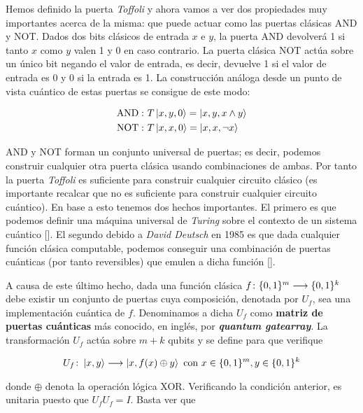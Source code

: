 Hemos definido la puerta \textit{Toffoli} y ahora vamos a ver dos propiedades muy importantes acerca de la misma: que puede actuar como las puertas clásicas AND y NOT. Dados dos bits clásicos de entrada $x$ e $y$, la puerta AND devolverá 1 si tanto $x$ como $y$ valen 1 y 0 en caso contrario. La puerta clásica NOT actúa sobre un único bit negando el valor de entrada, es decir, devuelve 1 si el valor de entrada es 0 y 0 si la entrada es 1. La construcción análoga desde un punto de vista cuántico de estas puertas se consigue de este modo:

\begin{equation}
\begin{split}
\mathrm{AND:\ }&T\left|x,y,0\right\rangle=\left|x,y,x\wedge y\right\rangle\\
\mathrm{NOT:\ }&T\left|x,x,0\right\rangle=\left|x,x,\neg x\right\rangle
\end{split}
\end{equation}

AND y NOT forman un conjunto universal de puertas; es decir, podemos construir cualquier otra puerta clásica usando combinaciones de ambas. Por tanto la puerta \textit{Toffoli} es suficiente para construir cualquier circuito clásico (es importante recalcar que no es suficiente para construir cualquier circuito cuántico). En base a esto tenemos dos hechos importantes. El primero es que podemos definir una máquina universal de \textit{Turing} sobre el contexto de un sistema cuántico [\cite{bernstein1997quantum}]. El segundo debido a \textit{David Deutsch} en 1985 es que dada cualquier función clásica computable, podemos conseguir una combinación de puertas cuánticas (por tanto reversibles) que emulen a dicha función [\cite{deutsch1985quantum}].

A causa de este último hecho, dada una función clásica $f\colon \{0,1\}^m\longrightarrow \{0,1\}^k$ debe existir un conjunto de puertas cuya composición, denotada por $U_f$, sea una implementación cuántica de $f$. Denominamos a dicha $U_f$ como \textbf{matriz de puertas cuánticas} más conocido, en inglés, por \textbf{\textit{quantum gatearray}}. La transformación $U_f$ actúa sobre $m+k$ qubits y se define para que verifique

\begin{equation}
U_f\colon \left|x,y\right\rangle\longrightarrow \left|x,f(x)\oplus y\right\rangle\mathrm{\ con\ }x\in\{0,1\}^m,y\in\{0,1\}^k
\end{equation}

donde $\oplus$ denota la operación lógica XOR. Verificando la condición anterior, es unitaria puesto que $U_fU_f=I$. Basta ver que 

